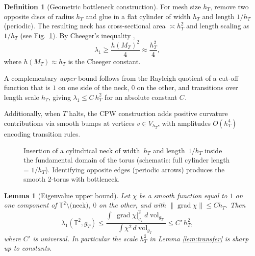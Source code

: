 \documentclass[11pt]{article}
\newtheorem{lemma}[theorem]{Lemma}
\theoremstyle{definition}\newtheorem{definition}[theorem]{Definition}
\theoremstyle{remark}\newtheorem{remark}[theorem]{Remark}
\DeclareMathOperator{\grad}{grad}
\DeclareMathOperator{\vol}{vol}
\begin{document}
\begin{definition}[Geometric bottleneck construction]
For mesh size $h_T$, remove two opposite discs of radius $h_T$ and glue
in a flat cylinder of width $h_T$ and length $1/h_T$ (periodic).
The resulting neck has cross-sectional area $\asymp h_T^{2}$ and length
scaling as $1/h_T$ (see Fig.~\ref{fig:neck}). By Cheeger's inequality
\cite{Cheeger1970},
\[
\lambda_1 \ge \frac{h(M_T)^2}{4} \approx \frac{h_T^2}{4},
\]
where $h(M_T) \approx h_T$ is the Cheeger constant.

A complementary \emph{upper} bound follows from the Rayleigh quotient of
a cut-off function that is $1$ on one side of the neck, $0$ on the other,
and transitions over length scale $h_T$, giving
$\lambda_1\le C\,h_T^{2}$ for an absolute constant $C$.

Additionally, when $T$ halts, the CPW construction adds positive curvature contributions via smooth bumps at vertices $v \in V_{h_T}$, with amplitudes $O(h_T^4)$ encoding transition rules.
\end{definition}

\begin{figure}[t]
\centering
{}
\caption{Insertion of a cylindrical neck of width~$h_T$ and
length~$1/h_T$ inside the fundamental domain of the torus (schematic: full cylinder length = $1/h_T$).  Identifying
opposite edges (periodic arrows) produces the smooth 2‑torus with bottleneck.}
\label{fig:neck}
\end{figure}

\begin{lemma}[Eigenvalue upper bound]\label{lem:upper2}
Let $\chi$ be a smooth function equal to $1$ on one component of
$\mathbb T^{2}\setminus\text{(neck)}$, $0$ on the other, and with
$\|\grad\chi\|\le C h_T$. Then
\[
\lambda_1(\mathbb T^{2},g_T)
\le
\frac{\int |\grad\chi|_{g_T}^{2}\,d\vol_{g_T}}
     {\int \chi^{2}\,d\vol_{g_T}}
\le
C'\,h_T^{2},
\]
where $C'$ is universal. In particular the scale $h_T^{2}$ in
Lemma \ref{lem:transfer} is sharp up to constants.
\end{lemma}
\end{document}
